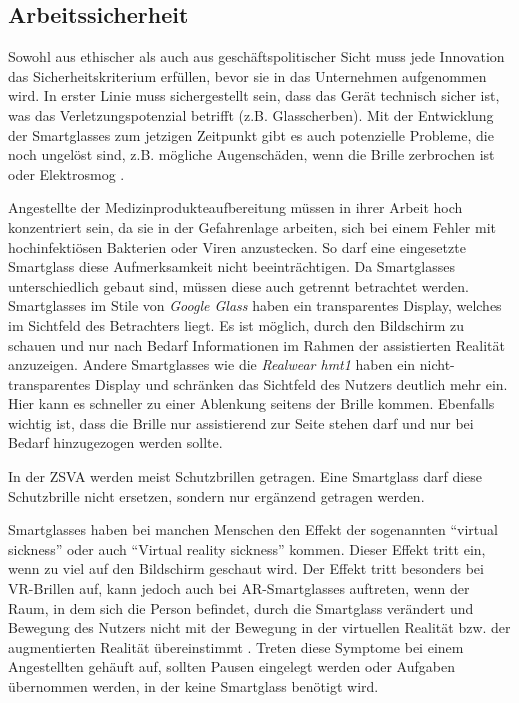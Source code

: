 \subsection{Arbeitssicherheit}
Sowohl aus ethischer als auch aus geschäftspolitischer Sicht muss jede Innovation das Sicherheitskriterium erfüllen, bevor sie in das Unternehmen aufgenommen wird. In erster Linie muss sichergestellt sein, dass das Gerät technisch sicher ist, was das Verletzungspotenzial betrifft (z.B. Glasscherben). Mit der Entwicklung der Smartglasses zum jetzigen Zeitpunkt gibt es auch potenzielle Probleme, die noch ungelöst sind, z.B. mögliche Augenschäden, wenn die Brille zerbrochen ist oder Elektrosmog \cite{Hein2016}.

Angestellte der Medizinprodukteaufbereitung müssen in ihrer Arbeit hoch konzentriert sein, da sie in der Gefahrenlage arbeiten, sich bei einem Fehler mit hochinfektiösen Bakterien oder Viren anzustecken. So darf eine eingesetzte Smartglass diese Aufmerksamkeit nicht beeinträchtigen. Da Smartglasses unterschiedlich gebaut sind, müssen diese auch getrennt betrachtet werden. Smartglasses im Stile von \emph{Google Glass} haben ein transparentes Display, welches im Sichtfeld des Betrachters liegt. Es ist möglich, durch den Bildschirm zu schauen und nur nach Bedarf Informationen im Rahmen der assistierten Realität anzuzeigen. Andere Smartglasses wie die \emph{Realwear hmt1} haben ein nicht- transparentes Display und schränken das Sichtfeld des Nutzers deutlich mehr ein. Hier kann es schneller zu einer Ablenkung seitens der Brille kommen. Ebenfalls wichtig ist, dass die Brille nur assistierend zur Seite stehen darf und nur bei Bedarf hinzugezogen werden sollte.

In der ZSVA werden meist Schutzbrillen getragen. Eine Smartglass darf diese Schutzbrille nicht ersetzen, sondern nur ergänzend getragen werden.

Smartglasses haben bei manchen Menschen den Effekt der sogenannten \enquote{virtual sickness} oder auch \enquote{Virtual reality sickness} kommen. Dieser Effekt tritt ein, wenn zu viel auf den Bildschirm geschaut wird. Der Effekt tritt besonders bei VR-Brillen auf, kann jedoch auch bei AR-Smartglasses auftreten, wenn der Raum, in dem sich die Person befindet, durch die Smartglass verändert und Bewegung des Nutzers nicht mit der Bewegung in der virtuellen Realität bzw. der augmentierten Realität übereinstimmt \cite{Moss2011}. Treten diese Symptome bei einem Angestellten gehäuft auf, sollten Pausen eingelegt werden oder Aufgaben übernommen werden, in der keine Smartglass benötigt wird.

